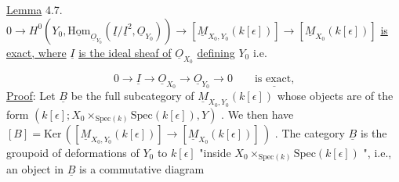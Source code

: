\underline{Lemma} 4.7.  $0 \to H^{0}(Y_{0}, \underline{\mathrm{Hom}}_{\underline{O}_{Y_{0}}} (\underline{I}/\underline{I}^{2}, \underline{O}_{Y_{0}})) \to [\underline{M}_{X_{0},Y_{0}}(k[\epsilon])] \to [\underline{M}_{X_{0}}(k[\epsilon])]$ \underline{is exact, where}  $\underline{I}$  \underline{is the ideal sheaf of}  $\underline{O}_{X_{0}}$  \underline{defining}  $Y_{0}$  i.e. 



\begin{equation*}
 0 \to \underline{I} \to \underline{O}_{X_0} \to \underline{O}_{Y_0} \to 0 \qquad \underline{\text{is exact,}}
\end{equation*}
\underline{Proof}: Let $\underline{B}$ be the full subcategory of $\underline{M}_{X_0,Y_0}(k[\epsilon])$ whose objects are of the form $(k[\epsilon]; X_0 \times_{\mathrm{Spec}(k)} \mathrm{Spec}(k[\epsilon]), Y)$ . We then have $[B] = \mathrm{Ker}\,([\underline{M}_{X_0,Y_0}(k[\epsilon])] \to [\underline{M}_{X_0}(k[\epsilon])]\,)$ . The category $\underline{B}$ is the groupoid of deformations of $Y_0$ to $k[\epsilon]$ "inside $X_0 \times_{\mathrm{Spec}(k)} \mathrm{Spec}(k[\epsilon])$ ", i.e., an object in $\underline{B}$ is a commutative diagram

